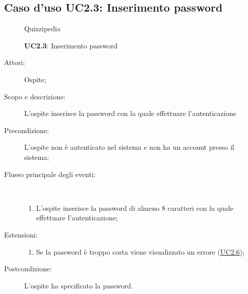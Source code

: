 \subsection{Caso d'uso UC2.3: Inserimento password}
\begin{figure}[H]
	\centering
	\begin{resizedtikzpicture}{\textwidth}
		\begin{umlsystem}[x=0, fill=lightgray!20]{Quizzipedia}
		\end{umlsystem}
	\end{resizedtikzpicture}
	\caption{\textbf{UC2.3}: Inserimento password}
	\label{UC2.3}
\end{figure}
\begin{description}
	\item[Attori:] Ospite;
	\item[Scopo e descrizione:] L'ospite inserisce la password con la quale effettuare l'autenticazione
	\item[Precondizione:] L'ospite non è autenticato nel sistema e non ha un account presso il sistema;
	
	\item[Flusso principale degli eventi:] \ 
	\begin{enumerate}
		\item L'ospite inserisce la password di almeno 8 caratteri con la quale effettuare l'autenticazione;
		
	\end{enumerate}
	\item[Estensioni:]
	\begin{enumerate}
		\item Se la password è troppo corta viene visualizzato un errore	 (\hyperlink{UC2.6}{UC2.6});
		
	\end{enumerate}
	\item[Postcondizione:] L'ospite ha specificato la password.
\end{description}
\hypertarget{UC2.4}{}
